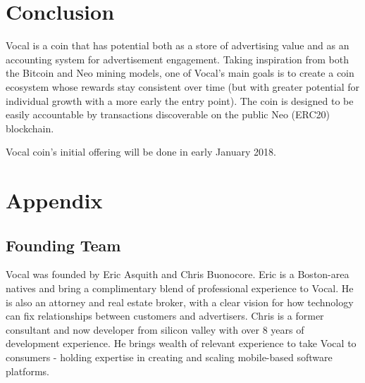 \documentclass[conference]{IEEEtran}
\begin{document}
      
      
    
    \section{Conclusion}
   Vocal is a coin that has potential both as a store of advertising value and as an accounting system for advertisement engagement. Taking inspiration from both the Bitcoin and Neo mining models, one of Vocal's main goals is to create a coin ecosystem whose rewards stay consistent over time (but with greater potential for individual growth with a more early the entry point). The coin is designed to be easily accountable by transactions discoverable on the public Neo (ERC20) blockchain.

   Vocal coin's initial offering will be done in early January 2018.

    
    \section*{Appendix}

    \subsection{Founding Team}
   Vocal was founded by Eric Asquith and Chris Buonocore. Eric is a Boston-area natives and bring a complimentary blend of professional experience to Vocal. He is also an attorney and real estate broker, with a clear vision for how technology can fix relationships between customers and advertisers. Chris is a former consultant and now developer from silicon valley with over 8 years of development experience. He brings wealth of relevant experience to take Vocal to consumers - holding expertise in creating and scaling mobile-based software platforms.  
\end{document}
